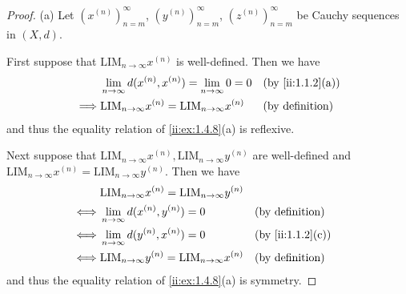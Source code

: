 \begin{proof}{(a)}
  Let \((x^{(n)})_{n = m}^\infty\), \((y^{(n)})_{n = m}^\infty\), \((z^{(n)})_{n = m}^\infty\) be Cauchy sequences in \((X, d)\).

  First suppose that \(\text{LIM}_{n \to \infty} x^{(n)}\) is well-defined.
  Then we have
  \begin{align*}
             & \lim_{n \to \infty} d(x^{(n)}, x^{(n)}) = \lim_{n \to \infty} 0 = 0   &  & \by{ii:1.1.2}[a]          \\
    \implies & \text{LIM}_{n \to \infty} x^{(n)} = \text{LIM}_{n \to \infty} x^{(n)} &  & \text{(by definition)}
  \end{align*}
  and thus the equality relation of \cref{ii:ex:1.4.8}(a) is reflexive.

  Next suppose that \(\text{LIM}_{n \to \infty} x^{(n)}, \text{LIM}_{n \to \infty} y^{(n)}\) are well-defined and \(\text{LIM}_{n \to \infty} x^{(n)} = \text{LIM}_{n \to \infty} y^{(n)}\).
  Then we have
  \begin{align*}
         & \text{LIM}_{n \to \infty} x^{(n)} = \text{LIM}_{n \to \infty} y^{(n)}                             \\
    \iff & \lim_{n \to \infty} d(x^{(n)}, y^{(n)}) = 0                           &  & \text{(by definition)} \\
    \iff & \lim_{n \to \infty} d(y^{(n)}, x^{(n)}) = 0                           &  & \by{ii:1.1.2}[c]          \\
    \iff & \text{LIM}_{n \to \infty} y^{(n)} = \text{LIM}_{n \to \infty} x^{(n)} &  & \text{(by definition)}
  \end{align*}
  and thus the equality relation of \cref{ii:ex:1.4.8}(a) is symmetry.


\end{proof}
